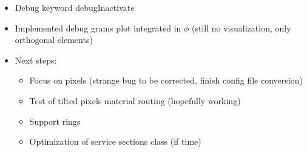 \documentclass[pdftex, 11pt]{beamer}
\begin{document}
\begin{frame}
  \begin{itemize}
  \item Debug keyword \alert{debugInactivate}
  \item Implemented debug \alert{grams plot} integrated in $\phi$ (still no visualization, only orthogonal elements)
  \item Next steps:
    \begin{itemize}
    \item Focus on pixels (strange \alert{bug} to be corrected, finish \alert{config file} conversion)
    \item Test of tilted pixels material routing (hopefully \alert{working})
    \item Support rings
    \item Optimization of service sections class (if time)
    \end{itemize}
  \end{itemize}
\end{frame}
\end{document}
